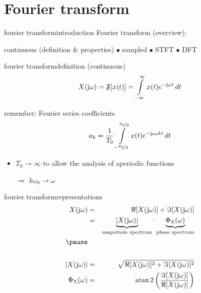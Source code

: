     \section[fourier transform]{Fourier transform}
        \begin{frame}{fourier transform}{introduction}
            Fourier transform (overview):
            
            continuous (definition \& properties) $\bullet$ sampled $\bullet$ STFT $\bullet$ DFT
            \vspace{30mm}
        \end{frame}	

        \begin{frame}{fourier transform}{definition (continuous)}
            \begin {equation*}\label{eq:fourier_transformation}
                X(\mathrm{j}\omega) = \mathfrak{F}[x(t)] = \int\limits_{-\infty}^{\infty} {x(t) {e}^{-\mathrm{j}\omega t}\, dt}
            \end {equation*}

            \pause
            remember: Fourier series coefficients 
            \begin {equation*}\label{eq:fourier_coeff}
                a_k = \frac{1}{T_0}\int\limits_{-\nicefrac{T_0}{2}}^{\nicefrac{T_0}{2}} x(t) {e}^{-\mathrm{j}\omega_0kt}\, dt \nonumber
            \end {equation*}
            
            \begin{itemize}
                \item	$T_0\rightarrow \infty$ to allow the analysis of aperiodic functions
                \item[$\Rightarrow$] $k\omega_0 \rightarrow \omega$
            \end{itemize}
        \end{frame}	

        \begin{frame}{fourier transform}{representations}
            \begin{eqnarray*}
                X(\jom) &=& \Re[X(\jom)] + \Im[X(\jom)]\\
                &=& \underbrace{|X(\jom)|}_{\text{magnitude spectrum}} \cdot \underbrace{\Phi_\mathrm{X}(\omega)}_{\text{phase spectrum}}\\
                \pause
                &&\\
                &&\\
                \bigskip
                |X(\jom)|  &=& \sqrt{\Re[X(\jom)]^2 + \Im[X(\jom)]^2}\\
                \Phi_\mathrm{X}(\omega)  &=& \atan2\left(\frac{\Im[X(\jom)]}{\Re[X(\jom)]}\right)
            \end{eqnarray*}
        \end{frame}	

